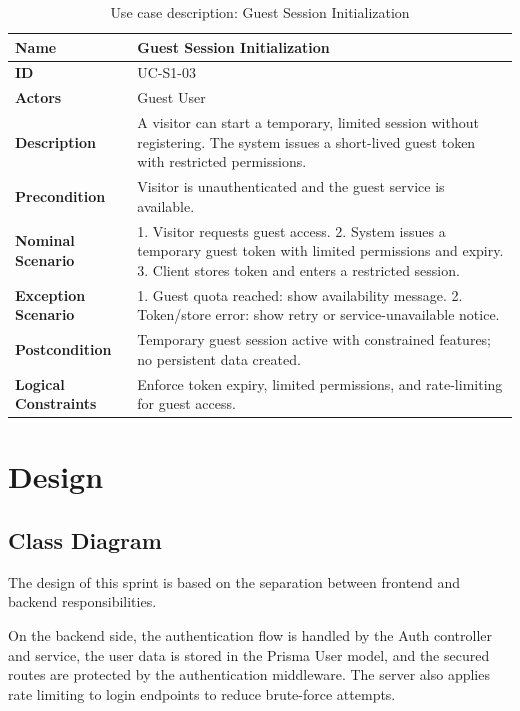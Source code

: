 \begin{table}[H]
    \centering
    \caption{Use case description: Guest Session Initialization}
    \label{tab:guest-usecase}
    \renewcommand{\arraystretch}{1.4}
    \small
    \begin{tabularx}{\textwidth}{|p{2.5cm}|X|}
        \hline
        \textbf{Name} & Guest Session Initialization \\\hline
        \textbf{ID} & UC-S1-03 \\\hline
        \textbf{Actors} & Guest User \\\hline
        \textbf{Description} & A visitor can start a temporary, limited session without registering. The system issues a short-lived guest token with restricted permissions. \\\hline
        \textbf{Precondition} & Visitor is unauthenticated and the guest service is available. \\\hline
        \textbf{Nominal Scenario} & 1. Visitor requests guest access. 2. System issues a temporary guest token with limited permissions and expiry. 3. Client stores token and enters a restricted session. \\\hline
        \textbf{Exception Scenario} & 1. Guest quota reached: show availability message. 2. Token/store error: show retry or service-unavailable notice. \\\hline
        \textbf{Postcondition} & Temporary guest session active with constrained features; no persistent data created. \\\hline
        \textbf{Logical Constraints} & Enforce token expiry, limited permissions, and rate-limiting for guest access. \\\hline
    \end{tabularx}
\end{table}

\section{Design}

\indent \subsection{Class Diagram}

\indent The design of this sprint is based on the separation between frontend and backend responsibilities.

\indent On the backend side, the authentication flow is handled by the Auth controller and service, the user data is stored in the Prisma User model, and the secured routes are protected by the authentication middleware. The server also applies rate limiting to login endpoints to reduce brute-force attempts.

